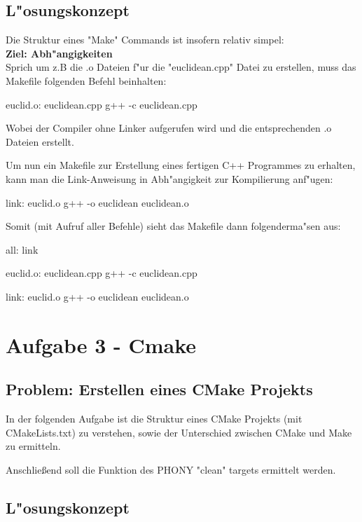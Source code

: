 \documentclass[a4paper,11pt,titlepage]{article}
\begin{document}
{    \subsection{L"osungskonzept}
    Die Struktur eines "Make" Commands ist insofern relativ simpel: \\
    \textbf{Ziel: Abh"angigkeiten} \\
    Sprich um z.B die .o Dateien f"ur die "euclidean.cpp" Datei zu erstellen, muss das Makefile folgenden Befehl beinhalten: \\
    \begin{listing}
        euclid.o: euclidean.cpp
        g++ -c euclidean.cpp
    \end{listing}
    Wobei der Compiler ohne Linker aufgerufen wird und die entsprechenden .o Dateien erstellt.

    Um nun ein Makefile zur Erstellung eines fertigen C++ Programmes zu erhalten, kann man die Link-Anweisung in Abh"angigkeit zur Kompilierung anf"ugen: \\
    \begin{listing}
        link: euclid.o
        g++ -o euclidean euclidean.o
    \end{listing}

    Somit (mit Aufruf aller Befehle) sieht das Makefile dann folgenderma"sen aus: \\
    \begin{listing}
        all: link

        euclid.o: euclidean.cpp
        g++ -c euclidean.cpp

        link: euclid.o
        g++ -o euclidean euclidean.o
    \end{listing}


    \section{Aufgabe 3 - Cmake}

    \subsection{Problem: Erstellen eines CMake Projekts}
    In der folgenden Aufgabe ist die Struktur eines CMake Projekts (mit CMakeLists.txt) zu verstehen, sowie der Unterschied zwischen CMake und Make zu ermitteln.

    Anschließend soll die Funktion des PHONY "clean" targets ermittelt werden.

    \subsection{L"osungskonzept}

}
\end{document}
